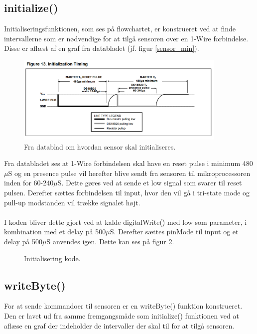 \subsection{initialize()}
Initialiseringsfunktionen, som ses på flowchartet, er konstrueret ved at finde intervallerne som er nødvendige for at tilgå sensoren over en 1-Wire forbindelse. Disse er aflæst af en graf fra databladet (jf. figur \ref{sensor_min}).
\begin{figure}[h!]
  \centering
  \includegraphics[width=0.9\textwidth]{figures/Initialization_timing.png}
  \caption{Fra datablad om hvordan sensor skal initialiseres.}
  \label{sensor_init}
\end{figure}
\newpage
Fra databladet ses at 1-Wire forbindelsen skal have en reset pulse i minimum 480$\mu$S og en presence pulse vil herefter blive sendt fra sensoren til mikroprocessoren inden for 60-240$\mu$S. Dette gøres ved at sende et low signal som svarer til reset pulsen. Derefter sættes forbindelsen til input, hvor den vil gå i tri-state mode og pull-up modstanden vil trække signalet højt. 
\\
\\
I koden bliver dette gjort ved at kalde digitalWrite() med low som parameter, i kombination med et delay på 500$\mu$S. Derefter sættes pinMode til input og et delay på 500$\mu$S anvendes igen. Dette kan ses på figur \ref{sensor_kode}.

\begin{figure}[h!]
  \centering
  \caption{Initialisering kode.}
  \label{sensor_kode}
\end{figure}

\subsection{writeByte()}
For at sende kommandoer til sensoren er en writeByte() funktion konstrueret. Den er lavet ud fra samme fremgangsmåde som initialize() funktionen ved at aflæse en graf der indeholder de intervaller der skal til for at tilgå sensoren.

